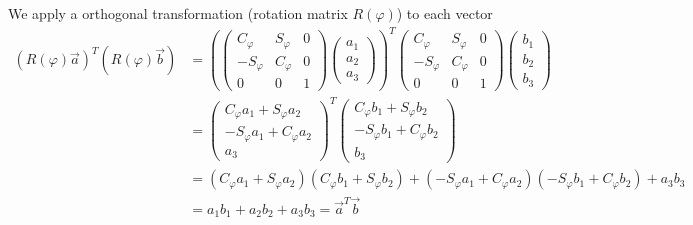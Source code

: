 \documentclass[11pt,a4paper]{article}
\begin{document}
\begin{enumerate}
We apply a orthogonal transformation (rotation matrix $R(\varphi)$) to each vector
\begin{align*}
(R(\varphi)\vec{a})^T(R(\varphi)\vec{b})
&=
\left(
\begin{pmatrix}
C_\varphi & S_\varphi & 0 \\
-S_\varphi & C_\varphi & 0 \\
0 & 0 & 1
\end{pmatrix}
\begin{pmatrix}
a_1 \\
a_2 \\
a_3
\end{pmatrix}
\right)
^T
\begin{pmatrix}
C_\varphi & S_\varphi & 0 \\
-S_\varphi & C_\varphi & 0 \\
0 & 0 & 1
\end{pmatrix}
\begin{pmatrix}
b_1 \\
b_2 \\
b_3
\end{pmatrix} \\
&=
\begin{pmatrix}
C_\varphi a_1+S_\varphi a_2 \\
-S_\varphi a_1+C_\varphi a_2 \\
a_3
\end{pmatrix}^T
\begin{pmatrix}
C_\varphi b_1+S_\varphi b_2 \\
-S_\varphi b_1+C_\varphi b_2 \\
b_3
\end{pmatrix} \\
&=
(C_\varphi a_1+S_\varphi a_2)(C_\varphi b_1+S_\varphi b_2)+(-S_\varphi a_1+C_\varphi a_2)(-S_\varphi b_1+C_\varphi b_2)+a_3b_3 \\
&=a_1b_1+a_2b_2+a_3b_3=\vec{a}^T\vec{b}
\end{align*}

\end{enumerate}
\end{document}
